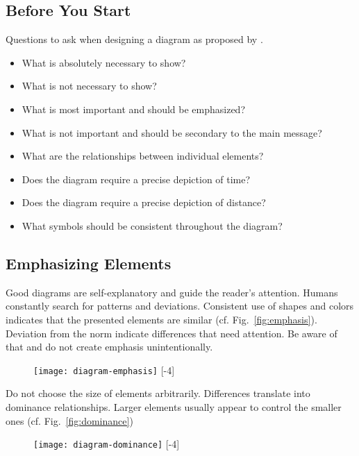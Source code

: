 

\subsection{Before You Start}

Questions to ask when designing a diagram as proposed by \cite{Carter12}.
\begin{itemize}
\item What is absolutely necessary to show?
\item What is not necessary to show?
\item What is most important and should be emphasized?
\item What is not important and should be secondary to the main message?
\item What are the relationships between individual elements?
\item Does the diagram require a precise depiction of time?
\item Does the diagram require a precise depiction of distance?
\item What symbols should be consistent throughout the diagram?
\end{itemize}


\subsection{Emphasizing Elements}

Good diagrams are self-explanatory and guide the reader's attention. Humans constantly search for patterns and deviations. Consistent use of shapes and colors indicates that the presented elements are similar (cf. Fig.~\ref{fig:emphasis}). Deviation from the norm indicate differences that need attention. Be aware of that and do not create emphasis unintentionally.

\begin{figure}[t]
\centering
\texttt{[image: diagram-emphasis]}
[-4\baselineskip]
\end{figure}

Do not choose the size of elements arbitrarily. Differences translate into dominance relationships. Larger elements usually appear to control the smaller ones (cf. Fig.~\ref{fig:dominance})

\begin{figure}[t]
\centering
\texttt{[image: diagram-dominance]}
[-4\baselineskip]
\end{figure}


